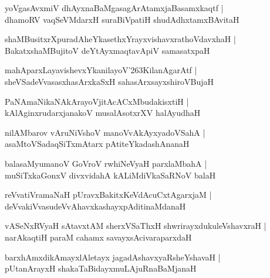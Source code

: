 \documentclass[twoside,12pt,openright]{book}
\def\S{\char'263}
\newcounter{shloka}[chapter]
\begin{document}
\begin{shloka}%
yoVgasAvxmiV dhAyxnaBaMgasagArAtamxjaBasamxkaqtf |\\
dhamoRV vaqSeVMdarxH suraBiVpatiH shudAdhxtamxBAvitaH 
\end{shloka}

\begin{shloka}%
shaMBusitxrXpuradAheYkasethxYrayxvishavxrathoVdavxhaH |\\
BakatxshaMBujitoV deYtAyxmaqtavApiV samasatxpaH 
\end{shloka}

\begin{shloka}%
mahAparxLayavishevxYkanilayoV\S KilanAgarAtf |\\
sheVSadeVvasasxhasArxkaSxH sahasArxsayxshiroVBujaH 
\end{shloka}

\begin{shloka}%
PaNAmaNikaNAkArayoVjitAcACxMbudakisxtiH |\\
kAlAginxrudarxjanakoV musalAsotxrXV halAyudhaH 
\end{shloka}

\begin{shloka}%
nilAMbarov vAruNiVshoV manoVvAkAyxyadoVSahA |\\
asaMtoVSadaqSiTxmAtarx pAtiteYkadashAnanaH 
\end{shloka}

\begin{shloka}%
balasaMyumanoV GoVroV rwhiNeVyaH parxlaMbahA |\\
muSiTxkaGonxV divxvidahA kALiMdiVkaSaRNoV balaH 
\end{shloka}

\begin{shloka}%
reVvatiVramaNaH pUravxBakitxKeVdAcuCxtAgarxjaM |\\
deVvakiVvasudeVvAhavxkashayxpAditinaMdanaH 
\end{shloka}

\begin{shloka}%
vASeNxRVyaH sAtavxtAM sherxVSaThxH shwrirayxdukuleVshavxraH |\\
narAkaqtiH paraM cahamx savayxsAcivaraparxdaH 
\end{shloka}

\begin{shloka}%
barxhAmxdikAmayxlAletayx jagadAshavxyaRsheYshavaH |\\
pUtanArayxH shakaTaBidayxmuLAjuRnaBaMjanaH 
\end{shloka}
\end{document}
